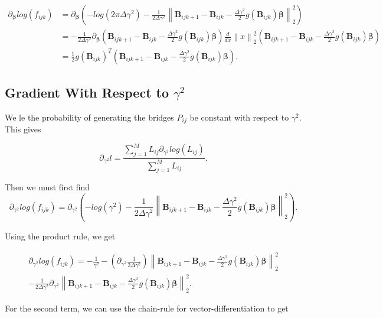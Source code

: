 \begin{equation} 
\begin{split}
\partial_{\bm \beta} log(f_{ijk}) & = \partial_{\bm \beta} (-log(2\pi \Delta \gamma^2) - \frac{1}{2\Delta \gamma^2} \left\lVert \textbf{B}_{ijk+1} - \textbf{B}_{ijk} - \frac{\Delta\gamma^2}{2} g(\textbf{B}_{ijk})\bm \beta \right\rVert_2^2) \\
& = -\frac{1}{2\Delta\gamma^2}\partial_{\bm \beta} (\textbf{B}_{ijk+1} - \textbf{B}_{ijk} - \frac{\Delta\gamma^2}{2} g(\textbf{B}_{ijk})\bm \beta) \frac{d}{dx} \left\lVert x \right\rVert_2^2(\textbf{B}_{ijk+1} - \textbf{B}_{ijk} - \frac{\Delta\gamma^2}{2} g(\textbf{B}_{ijk})\bm \beta) \\
& = \frac{1}{2} g(\textbf{B}_{ijk})^T(\textbf{B}_{ijk+1} - \textbf{B}_{ijk} - \frac{\Delta\gamma^2}{2} g(\textbf{B}_{ijk})\bm \beta).
\end{split}
\end{equation}




\subsection{Gradient With Respect to $\gamma^2$}
We le the probability of generating the bridges $P_{ij}$ be constant with respect to $\gamma^2$. This gives

$$
\partial_{\gamma^2}l = \frac{\sum_{j=1}^ML_{ij}\partial_{\gamma^2} log(L_{ij})}{\sum_{j=1}^ML_{ij}}.
$$

Then we must first find
$$
\partial_{\gamma^2} log(f_{ijk}) = \partial_{\gamma^2} (-log(\gamma^2) - \frac{1}{2\Delta\gamma^2}\left\lVert \textbf{B}_{ijk+1} - \textbf{B}_{ijk} - \frac{\Delta\gamma^2}{2} g(\textbf{B}_{ijk})\bm \beta \right\rVert_2^2).
$$

Using the product rule, we get

\begin{align*}
\partial_{\gamma^2} log(f_{ijk})  = -\frac{1}{\gamma^2} -(\partial_{\gamma^2} \frac{1}{2\Delta \gamma^2})\left\lVert \textbf{B}_{ijk+1} - \textbf{B}_{ijk} - \frac{\Delta\gamma^2}{2} g(\textbf{B}_{ijk})\bm \beta \right\rVert_2^2 \\ -  \frac{1}{2\Delta \gamma^2} \partial_{\gamma^2} \left\lVert \textbf{B}_{ijk+1} - \textbf{B}_{ijk} - \frac{\Delta\gamma^2}{2} g(\textbf{B}_{ijk})\bm \beta \right\rVert_2^2.
\end{align*}

For the second term, we can use the chain-rule for vector-differentiation to get

